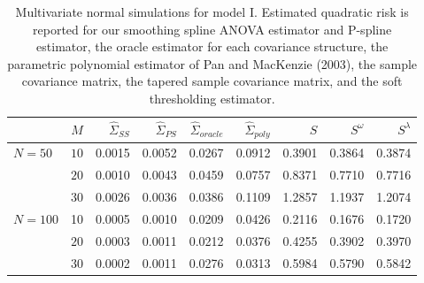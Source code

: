 \begin{table}[H]
\centering
\caption{Multivariate normal simulations for model I. Estimated quadratic risk is reported for our smoothing spline ANOVA estimator and P-spline estimator, the oracle estimator for each covariance structure, the parametric polynomial estimator of Pan and MacKenzie (2003), the sample covariance matrix, the tapered sample covariance matrix,
                                    and the soft thresholding estimator.}
\begin{tabular}{lrrrrrrrr}
& $M$ &$\hat{\Sigma}_{SS}$& $\hat{\Sigma}_{PS}$ &$\hat{\Sigma}_{oracle}$& $\hat{\Sigma}_{poly}$ & $S$ &$S^\omega$& $S^\lambda$ \\ 
  \hline
  $N = 50$ & $10$ & 0.0015 & 0.0052 & 0.0267 & 0.0912 & 0.3901 & 0.3864 & 0.3874 \\ 
   & $20$ & 0.0010 & 0.0043 & 0.0459 & 0.0757 & 0.8371 & 0.7710 & 0.7716 \\ 
   & $30$ & 0.0026 & 0.0036 & 0.0386 & 0.1109 & 1.2857 & 1.1937 & 1.2074 \\ 
 $N = 100$ & 10 & 0.0005 & 0.0010 & 0.0209 & 0.0426 & 0.2116 & 0.1676 & 0.1720 \\ 
    &   $20$ & 0.0003 & 0.0011 & 0.0212 & 0.0376 & 0.4255 & 0.3902 & 0.3970 \\ 
    &   $30$ & 0.0002 & 0.0011 & 0.0276 & 0.0313 & 0.5984 & 0.5790 & 0.5842 \\ 
   \hline
\end{tabular} 
\label{table:simulation-1-quad-loss-sigma-1}
\end{table}
